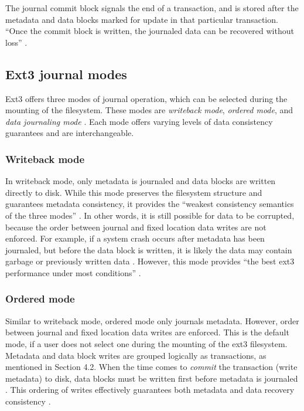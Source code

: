 The journal commit block signals the end of a transaction, and is stored after the metadata and data blocks marked for update in that particular transaction. ``Once the commit block is written, the journaled data can be recovered without loss'' \citep[p. 109]{Prabhakaran2005a}.

\subsection{Ext3 journal modes}

Ext3 offers three modes of journal operation, which can be selected during the mounting of the filesystem. These modes are \emph{writeback mode}, \emph{ordered mode}, and \emph{data journaling mode} \citep{Prabhakaran2005a, Jones2008, Mauerer2008}. Each mode offers varying levels of data consistency guarantees and are interchangeable.

\subsubsection{Writeback mode}

In writeback mode, only metadata is journaled and data blocks are written directly to disk. While this mode preserves the filesystem structure and guarantees metadata consistency, it provides the ``weakest consistency semantics of the three modes'' \citep[p. 108]{Prabhakaran2005a}. In other words, it is still possible for data to be corrupted, because the order between journal and fixed location data writes are not enforced. For example, if a system crash occurs after metadata has been journaled, but before the data block is written, it is likely the data may contain garbage or previously written data \citep{Jones2008, Prabhakaran2005a}. However, this mode provides ``the best ext3 performance under most conditions'' \citep[p. 2]{Robbins2001b}.

\subsubsection{Ordered mode}

Similar to writeback mode, ordered mode only journals metadata. However, order between journal and fixed location data writes are enforced. This is the default mode, if a user does not select one during the mounting of the ext3 filesystem. Metadata and data block writes are grouped logically as transactions, as mentioned in Section 4.2. When the time comes to \emph{commit} the transaction (write metadata) to disk, data blocks must be written first before metadata is journaled \citep{Robbins2001b}. This ordering of writes effectively guarantees both metadata and data recovery consistency \citep{Jones2008, Prabhakaran2005a}.

